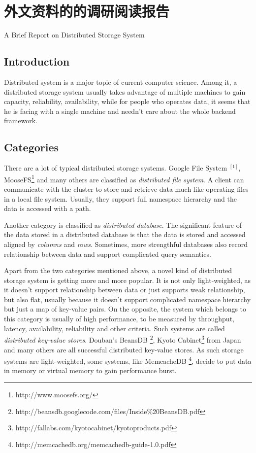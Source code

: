 \chapter{外文资料的的调研阅读报告}

\begin{center}
A Brief Report on Distributed Storage System
\end{center}

\section*{Introduction}
Distributed system is a major topic of current computer science. Among it, a
distributed storage system usually takes advantage of multiple machines to
gain capacity, reliability, availability, while for people who operates data,
it seems that he is facing with a single machine and needn't care about the
whole backend framework.

\section*{Categories}
There are a lot of typical distributed storage systems. Google File System
$^{[1]}$, MooseFS\footnote{http://www.moosefs.org/} and many others are
classified as \emph{distributed file system}. A client can communicate with
the cluster to store and retrieve data much like operating files in a local
file system. Usually, they support full namespace hierarchy and the data is
accessed with a path.

Another category is classified as \emph{distributed database}. The significant
feature of the data stored in a distributed database is that the data is
stored and accessed aligned by \emph{columns} and \emph{rows}. Sometimes, more
strengthful databases also record relationship between data and support
complicated query semantics.

Apart from the two categories mentioned above, a novel kind of distributed
storage system is getting more and more popular. It is not only
light-weighted, as it doesn't support relationship between data or just
supports weak relationship, but also flat, usually because it doesn't support
complicated namespace hierarchy but just a map of key-value pairs. On the
opposite, the system which belongs to this category is usually of high
performance, to be measured by throughput, latency, availability, reliability
and other criteria. Such systems are called \emph{distributed key-value
stores}. Douban's BeansDB
\footnote{http://beansdb.googlecode.com/files/Inside\%20BeansDB.pdf}, Kyoto
Cabinet\footnote{http://fallabs.com/kyotocabinet/kyotoproducts.pdf} from Japan
and many others are all successful distributed key-value stores. As such
storage systems are light-weighted, some systems, like MemcacheDB
\footnote{http://memcachedb.org/memcachedb-guide-1.0.pdf}, decide to put data
in memory or virtual memory to gain performance burst.

